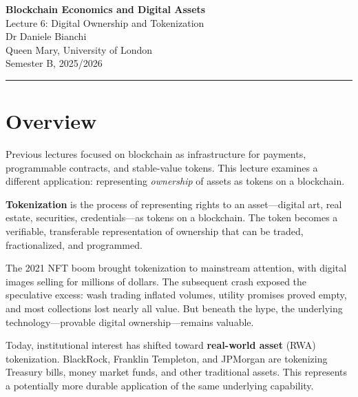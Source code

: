 \documentclass[11pt,a4paper]{article}
\newcommand{\keyword}[1]{\textbf{\textcolor{AccentOrange}{#1}}}
\begin{document}
\begin{center}
    {\LARGE\bfseries\textcolor{ImperialBlue}{Blockchain Economics and Digital Assets}}\\[0.5em]
    {\Large Lecture 6: Digital Ownership and Tokenization}\\[1em]
    {\large Dr Daniele Bianchi}\\[0.5em]
    {\normalsize Queen Mary, University of London}\\[0.3em]
    {\normalsize Semester B, 2025/2026}
\end{center}

\vspace{1em}
\hrule
\vspace{1em}

\tableofcontents

\vspace{2cm}

\section*{Overview}

Previous lectures focused on blockchain as infrastructure for payments, programmable contracts, and stable-value tokens. This lecture examines a different application: representing \textit{ownership} of assets as tokens on a blockchain.

\keyword{Tokenization} is the process of representing rights to an asset---digital art, real estate, securities, credentials---as tokens on a blockchain. The token becomes a verifiable, transferable representation of ownership that can be traded, fractionalized, and programmed.

The 2021 NFT boom brought tokenization to mainstream attention, with digital images selling for millions of dollars. The subsequent crash exposed the speculative excess: wash trading inflated volumes, utility promises proved empty, and most collections lost nearly all value. But beneath the hype, the underlying technology---provable digital ownership---remains valuable.

Today, institutional interest has shifted toward \keyword{real-world asset} (RWA) tokenization. BlackRock, Franklin Templeton, and JPMorgan are tokenizing Treasury bills, money market funds, and other traditional assets. This represents a potentially more durable application of the same underlying capability.
\end{document}

